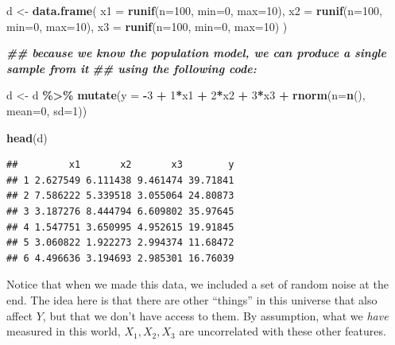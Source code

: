 \documentclass[
]{book}
\newenvironment{Shaded}{\begin{snugshade}}{\end{snugshade}}
\newcommand{\AttributeTok}[1]{\textcolor[rgb]{0.13,0.29,0.53}{#1}}
\newcommand{\DecValTok}[1]{\textcolor[rgb]{0.00,0.00,0.81}{#1}}
\newcommand{\DocumentationTok}[1]{\textcolor[rgb]{0.56,0.35,0.01}{\textbf{\textit{#1}}}}
\newcommand{\FunctionTok}[1]{\textcolor[rgb]{0.13,0.29,0.53}{\textbf{#1}}}
\newcommand{\NormalTok}[1]{#1}
\newcommand{\OtherTok}[1]{\textcolor[rgb]{0.56,0.35,0.01}{#1}}
\newcommand{\SpecialCharTok}[1]{\textcolor[rgb]{0.81,0.36,0.00}{\textbf{#1}}}
\theoremstyle{definition}
\theoremstyle{definition}
\theoremstyle{definition}
\theoremstyle{definition}
\theoremstyle{remark}
\begin{document}
\begin{Shaded}
\begin{Highlighting}[]
\NormalTok{d }\OtherTok{\textless{}{-}} \FunctionTok{data.frame}\NormalTok{(}
  \AttributeTok{x1 =} \FunctionTok{runif}\NormalTok{(}\AttributeTok{n=}\DecValTok{100}\NormalTok{, }\AttributeTok{min=}\DecValTok{0}\NormalTok{, }\AttributeTok{max=}\DecValTok{10}\NormalTok{), }
  \AttributeTok{x2 =} \FunctionTok{runif}\NormalTok{(}\AttributeTok{n=}\DecValTok{100}\NormalTok{, }\AttributeTok{min=}\DecValTok{0}\NormalTok{, }\AttributeTok{max=}\DecValTok{10}\NormalTok{), }
  \AttributeTok{x3 =} \FunctionTok{runif}\NormalTok{(}\AttributeTok{n=}\DecValTok{100}\NormalTok{, }\AttributeTok{min=}\DecValTok{0}\NormalTok{, }\AttributeTok{max=}\DecValTok{10}\NormalTok{)}
\NormalTok{)}

\DocumentationTok{\#\# because we know the population model, we can produce a single sample from it }
\DocumentationTok{\#\# using the following code: }

\NormalTok{d }\OtherTok{\textless{}{-}}\NormalTok{ d }\SpecialCharTok{\%\textgreater{}\%} 
  \FunctionTok{mutate}\NormalTok{(}\AttributeTok{y =} \SpecialCharTok{{-}}\DecValTok{3} \SpecialCharTok{+} \DecValTok{1}\SpecialCharTok{*}\NormalTok{x1 }\SpecialCharTok{+} \DecValTok{2}\SpecialCharTok{*}\NormalTok{x2 }\SpecialCharTok{+} \DecValTok{3}\SpecialCharTok{*}\NormalTok{x3 }\SpecialCharTok{+} \FunctionTok{rnorm}\NormalTok{(}\AttributeTok{n=}\FunctionTok{n}\NormalTok{(), }\AttributeTok{mean=}\DecValTok{0}\NormalTok{, }\AttributeTok{sd=}\DecValTok{1}\NormalTok{))}

\FunctionTok{head}\NormalTok{(d)}
\end{Highlighting}
\end{Shaded}

\begin{verbatim}
##         x1       x2       x3        y
## 1 2.627549 6.111438 9.461474 39.71841
## 2 7.586222 5.339518 3.055064 24.80873
## 3 3.187276 8.444794 6.609802 35.97645
## 4 1.547751 3.650995 4.952615 19.91845
## 5 3.060822 1.922273 2.994374 11.68472
## 6 4.496636 3.194693 2.985301 16.76039
\end{verbatim}

Notice that when we made this data, we included a set of random noise at the end. The idea here is that there are other ``things'' in this universe that also affect \(Y\), but that we don't have access to them. By assumption, what we \emph{have} measured in this world, \(X_1, X_2, X_3\) are uncorrelated with these other features.
\end{document}
